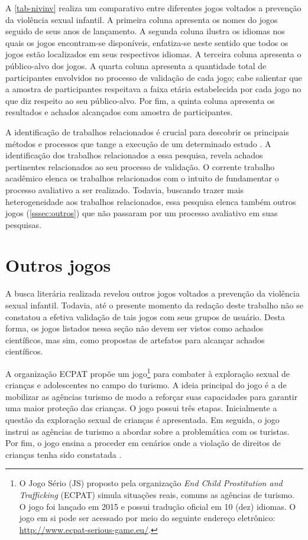 A \autoref{tab-nivinv} realiza um comparativo entre diferentes jogos voltados a prevenção da violência sexual infantil. A primeira coluna apresenta os nomes do jogos seguido de seus anos de lançamento. A segunda coluna ilustra os idiomas nos quais os jogos encontram-se disponíveis, enfatiza-se neste sentido que todos os jogos estão localizados em seus respectivos idiomas. A terceira coluna apresenta o público-alvo dos jogos. A quarta coluna apresenta a quantidade total de participantes envolvidos no processo de validação de cada jogo; cabe salientar que a amostra de participantes respeitava a faixa etária estabelecida por cada jogo no que diz respeito ao seu público-alvo. Por fim, a quinta coluna apresenta os resultados e achados alcançados com amostra de participantes. 

A identificação de trabalhos relacionados é crucial para descobrir os principais métodos e processos que tange a execução de um determinado estudo \cite{wazlawick2014metodologia}. A identificação dos trabalhos relacionados a essa pesquisa, revela achados pertinentes relacionados ao seu processo de validação. O corrente trabalho acadêmico elenca os trabalhos relacionados com o intuito de fundamentar o processo avaliativo a ser realizado. Todavia, buscando trazer mais heterogeneidade aos trabalhos relacionados, essa pesquisa elenca também outros jogos (\autoref{sssec:outros}) que não passaram por um processo avaliativo em suas pesquisas. 

\section{Outros jogos}\label{sssec:outros}

A busca literária realizada revelou outros jogos voltados a prevenção da violência sexual infantil. Todavia, até o presente momento da redação deste trabalho não se constatou a efetiva validação de tais jogos com seus grupos de usuário. Desta forma, os jogos listados nessa seção não devem ser vistos como achados científicos, mas sim, como propostas de artefatos para alcançar achados científicos.

A organização \ac{ECPAT} propõe um jogo\footnote{O Jogo Sério (JS) proposto pela organização \textit{End Child Prostitution and Trafficking} (ECPAT) simula situações reais, comuns as agências de turismo. O jogo foi lançado em 2015 e possui tradução oficial em 10 (dez) idiomas. O jogo em si pode ser acessado por meio do seguinte endereço eletrônico: \url{http://www.ecpat-serious-game.eu/}.} para combater à exploração sexual de crianças e adolescentes no campo do turismo. A ideia principal do jogo é a de mobilizar as agências turismo de modo a reforçar suas capacidades para garantir uma maior proteção das crianças. O jogo possui três etapas. Inicialmente a questão da exploração sexual de crianças é apresentada. Em seguida, o jogo instrui as agências de turismo a abordar sobre a problemática com os turistas. Por fim, o jogo ensina a proceder em cenários onde a violação de direitos de crianças tenha sido constatada \cite{gopalan2018social}. 

